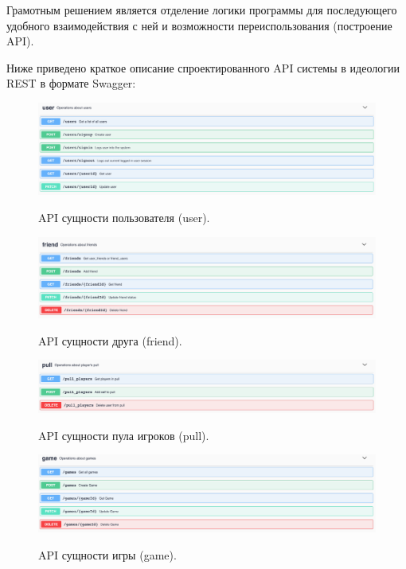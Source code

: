 \documentclass[a4paper,14pt]{extarticle}
\begin{document}
 	Грамотным решением является отделение логики программы для последующего удобного взаимодействия с ней и возможности переиспользования (построение API).
 	
 	Ниже приведено краткое описание спроектированного API системы в идеологии REST в формате Swagger:
 	
 	\begin{figure}[h!]
 		\begin{center}
 			{\includegraphics[scale = 0.35]{img/user.png}}
 			\label{ris:user}
 		\end{center}
 		\caption{API сущности пользователя (user).}
 	\end{figure}
 
 	\newpage
 
 	\begin{figure}[h!]
 		\begin{center}
 			{\includegraphics[scale = 0.4]{img/friend.png}}
 			\label{ris:friend}
 		\end{center}
 		\caption{API сущности друга (friend).}
 	\end{figure}
 
 	\begin{figure}[h!]
 		\begin{center}
 			{\includegraphics[scale = 0.4]{img/pull.png}}
 			\label{ris:pull}
 		\end{center}
 		\caption{API сущности пула игроков (pull).}
 	\end{figure}
 
 	\begin{figure}[h!]
 		\begin{center}
 			{\includegraphics[scale = 0.4]{img/game.png}}
 			\label{ris:game}
 		\end{center}
 		\caption{API сущности игры (game).}
 	\end{figure}
 	 
\end{document}
